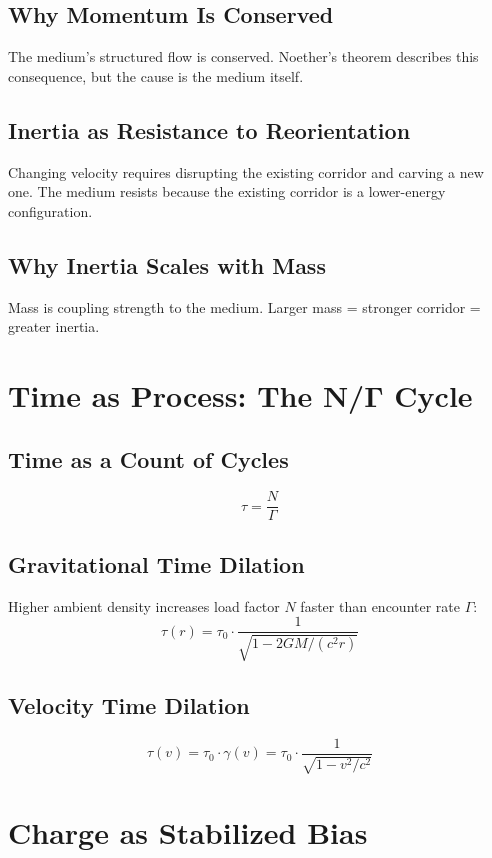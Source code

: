 \documentclass[12pt, a4paper]{article}
\begin{document}
\subsection{Why Momentum Is Conserved}

The medium's structured flow is conserved. Noether's theorem describes this consequence, but the cause is the medium itself.

\subsection{Inertia as Resistance to Reorientation}

Changing velocity requires disrupting the existing corridor and carving a new one. The medium resists because the existing corridor is a lower-energy configuration.

\subsection{Why Inertia Scales with Mass}

Mass is coupling strength to the medium. Larger mass = stronger corridor = greater inertia.

\section{Time as Process: The N/Γ Cycle}

\subsection{Time as a Count of Cycles}
\[
\tau = \frac{N}{\Gamma}
\]

\subsection{Gravitational Time Dilation}

Higher ambient density increases load factor \( N \) faster than encounter rate \( \Gamma \):
\[
\tau(r) = \tau_0 \cdot \frac{1}{\sqrt{1 - 2GM/(c^2 r)}}
\]

\subsection{Velocity Time Dilation}
\[
\tau(v) = \tau_0 \cdot \gamma(v) = \tau_0 \cdot \frac{1}{\sqrt{1 - v^2/c^2}}
\]

\section{Charge as Stabilized Bias}
\end{document}
